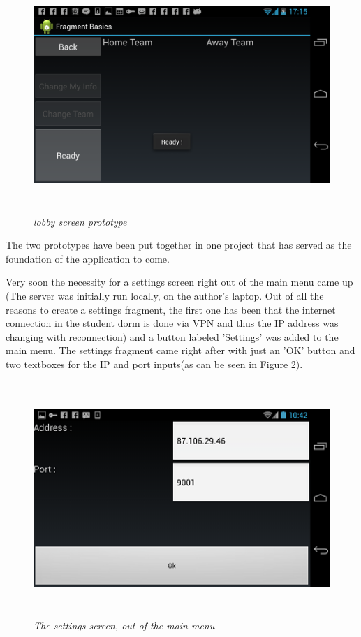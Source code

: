 \documentclass{article}
\begin{document}
\begin{figure}
\includegraphics[height=3.5in,width=6.23in]{./images/android_screenshots/menu_prototype/MENU_prototype_2.png}  
\caption{\small \sl lobby screen prototype \label{fig:menuPrototype2}}
\end{figure}

The two prototypes have been put together in one project that has served as the
foundation of the application to come.\newline

Very soon the necessity for a settings screen right out of the main menu came up
(The server was initially run locally, on the author's laptop. Out of all the
reasons to create a settings fragment, the first one has been that the internet
connection in the student dorm is done via VPN and thus the IP address was
changing with reconnection) and a button labeled 'Settings' was added to the
main menu. The settings fragment came right after with just an 'OK' button and
two textboxes for the IP and port inputs(as can be seen in Figure
\ref{fig:main_menu_settings}).\newline

\begin{figure}
\includegraphics[height=3.5in,width=6.23in]{./images/android_screenshots/tutorial_main_settings.png}  
\caption{\small \sl The settings screen, out of the main
menu\label{fig:main_menu_settings}}
\end{figure}
\end{document}
